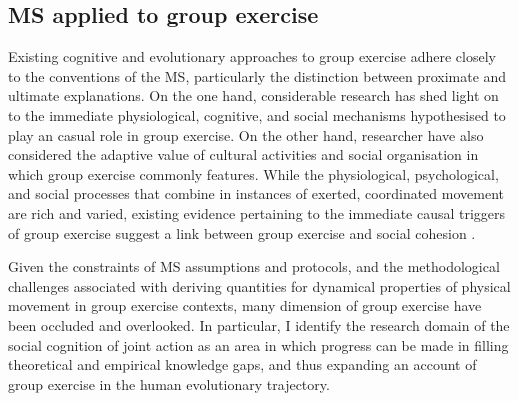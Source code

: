 \subsection{MS applied to group exercise}
Existing cognitive and evolutionary approaches to group exercise adhere closely to the conventions of the MS, particularly the distinction between proximate and ultimate explanations.  On the one hand, considerable research has shed light on to the immediate physiological, cognitive, and social mechanisms hypothesised to play an casual role in group exercise.  On the other hand, researcher have also considered the adaptive value of cultural activities and social organisation in which group exercise commonly features.  While the physiological, psychological, and social processes that combine in instances of exerted, coordinated movement are rich and varied, existing evidence pertaining to the immediate causal triggers of group exercise suggest a link between group exercise and social cohesion \citep{Davis2015,Cohen2017}.

Given the constraints of MS assumptions and protocols, and the methodological challenges associated with deriving quantities for dynamical properties of physical movement in group exercise contexts, many dimension of group exercise have been occluded and overlooked.  In particular, I identify the research domain of the social cognition of joint action as an area in which progress can be made in filling theoretical and empirical knowledge gaps, and thus expanding an account of group exercise in the human evolutionary trajectory.



